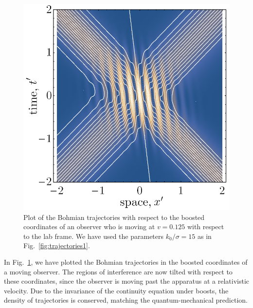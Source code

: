 \documentclass[
prx
,twocolumn
,nofootinbib
,floatfix
,superscriptaddress
]{revtex4-2}
\begin{document}
\begin{figure}[h]
    \centering
    \includegraphics[width=0.8\linewidth]{Fig6boostedsimplified.png}
    \caption{Plot of the Bohmian trajectories with respect to the boosted coordinates of an observer who is moving at $v = 0.125$ with respect to the lab frame. We have used the parameters $k_0/\sigma  = 15$ as in Fig.\ \ref{fig:trajectories1}. }
    \label{fig:trajectoriesboost1}
\end{figure}
In Fig.\ \ref{fig:trajectoriesboost1}, we have plotted the Bohmian trajectories in the boosted coordinates of a moving observer. The regions of interference are now tilted with respect to these coordinates, since the observer is moving past the apparatus at a relativistic velocity. Due to the invariance of the continuity equation under boosts, the density of trajectories is conserved, matching the quantum-mechanical prediction.
\end{document}

